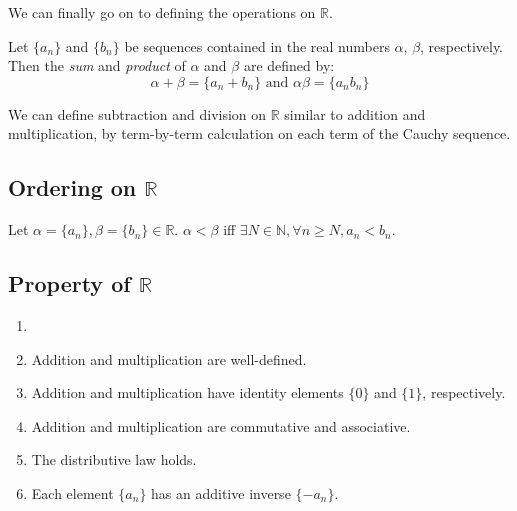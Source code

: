 \documentclass{report}
\begin{document}
			We can finally go on to defining the operations on $\mathbb{R}$.
		
			\begin{defn} \label{def_add_mult_R}
				Let $\{a_n\}$ and $\{b_n\}$ be sequences contained in the real numbers $\alpha$, $\beta$, respectively. Then the \emph{sum} and \emph{product} of $\alpha$ and $\beta$ are defined by:
				\begin{displaymath}
					\alpha+\beta=\{a_n+b_n\} \text{   and   } \alpha\beta=\{a_n b_n\}
				\end{displaymath}
			\end{defn}
		
			We can define subtraction and division on $\mathbb{R}$ similar to addition and multiplication, by term-by-term calculation on each term of the Cauchy sequence.
		
		\subsection{Ordering on $\mathbb{R}$}
		
			\begin{defn} \label{def_order_R}
				Let $\alpha=\{a_n\},\beta=\{b_n\} \in \mathbb{R}$. $\alpha<\beta$ iff $\exists N \in \mathbb{N}, \forall n \ge N, a_n<b_n$.
			\end{defn}
		
		\subsection{Property of $\mathbb{R}$}
		
			\begin{thm} \label{thm_property_R}
				\begin{enumerate}
					\item[]
					\item Addition and multiplication are well-defined.
					\item Addition and multiplication have identity elements $\{0\}$ and $\{1\}$, respectively.
					\item Addition and multiplication are commutative and associative.
					\item The distributive law holds.
					\item Each element $\{a_n\}$ has an additive inverse $\{-a_n\}$.
				\end{enumerate}
			\end{thm}
		
\end{document}

